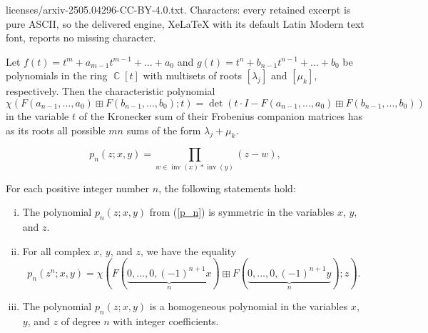 \documentclass[10pt,a4paper]{amsart}
\DeclareMathOperator{\Cc}{\mathbb{C}}
\DeclareMathOperator{\inv}{\mathrm{inv}}
\begin{document}
licenses/arxiv-2505.04296-CC-BY-4.0.txt. Characters: every retained excerpt is pure ASCII, so the delivered engine, XeLaTeX with its default Latin Modern text font, reports no missing character.
\begin{prop}\label{coroll1}
Let $f(t) = t^m + a_{m-1}t^{m-1} + \dots + a_0$ and $g(t) = t^n + b_{n-1}t^{n-1} + \dots + b_0$ be polynomials in the ring $\Cc[t]$ with multisets of roots $[\lambda_j]$ and $[\mu_k]$, respectively. Then the characteristic polynomial
$$\chi(F(a_{n-1}, \dots, a_0)\boxplus F(b_{n-1}, \dots, b_0); t) = \det(t\cdot I - F(a_{n-1}, \dots, a_0)\boxplus F(b_{n-1}, \dots, b_0))$$
in the variable $t$ of the Kronecker sum of their Frobenius companion matrices has as its roots all possible $mn$ sums of the form $\lambda_j + \mu_k$.
\end{prop}

\begin{equation}\label{p_n}
p_n(z; x,y) = \prod\limits_{w\in \inv(x)\ast \inv(y)} (z - w),
\end{equation}

\begin{prop}\label{prop10}
For each positive integer number $n$, the following statements hold:

\begin{enumerate}[(i)]

\item The polynomial $p_n(z; x, y)$ from (\ref{p_n}) is symmetric in the variables $x$, $y$, and $z$.

\item For all complex $x$, $y$, and $z$, we have the equality
$$p_n(z^n; x, y) = \chi(F(\underset{n}{\underbrace{0,\dots,0,(-1)^{n+1}x}})\boxplus F(\underset{n}{\underbrace{0,\dots,0,(-1)^{n+1}y}}); z).$$

\item The polynomial $p_n(z; x, y)$ is a homogeneous polynomial in the variables $x$, $y$, and $z$ of degree $n$ with integer coefficients.
\end{enumerate}

\end{prop}
\end{document}
